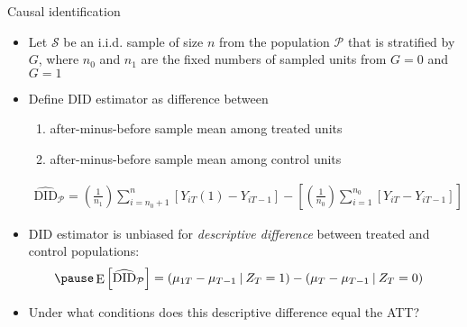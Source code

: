 \documentclass[table, xcolor={dvipsnames}, 9pt]{beamer}
\newcommand\given[1][]{\:#1\vert\:}
\theoremstyle{newstyle}
\DeclareMathOperator{\E}{\mathrm{E}}
\begin{document}
\begin{frame}{Causal identification}
\begin{itemize}
\item Let $\mathcal{S}$ be an i.i.d. sample of size $n$ from the population $\mathcal{P}$ that is stratified by $G$, where $n_0$ and $n_1$ are the fixed numbers of sampled units from $G = 0$ and $G = 1$
\item \pause Define DID estimator as difference between
\begin{enumerate}
\item \pause after-minus-before sample mean among treated units
\item \pause after-minus-before sample mean among control units
\end{enumerate} \pause 
\begin{align*}
\widehat{\text{DID}}_{\mathcal{P}} = \left(\frac{1}{n_1}\right)\sum_{i = n_0 + 1}^{n} \left[Y_{iT}(1) - Y_{iT-1}\right] - \left[\left(\frac{1}{n_0}\right)\sum_{i = 1}^{n_0} \left[Y_{iT} - Y_{iT-1}\right]\right]
\end{align*}
\item \pause DID estimator is unbiased for \textit{descriptive difference} between treated and control populations:
\begin{align*} \pause 
\E\left[\widehat{\text{DID}}_{\mathcal{P}}\right] & = \left(\mu_{1T} - \mu_{T-1} \given Z_T = 1\right) - \left(\mu_{T} - \mu_{T-1} \given Z_T = 0\right)
\end{align*}
\item \pause Under what conditions does this descriptive difference equal the ATT?
\end{itemize}	
\end{frame}
\end{document}
